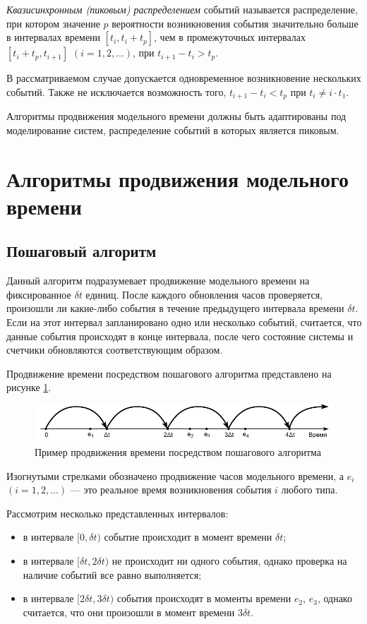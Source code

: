 \textit{Квазисинхронным (пиковым) распределением} событий называется распределение, при котором значение $p$ вероятности возникновения события значительно больше в интервалах времени $[t_i, t_i + t_p]$, чем в промежуточных интервалах $[t_i + t_p, t_{i+1}]$ $(i = 1, 2, ...)$, при $t_{i+1} - t_i > t_p$.

В рассматриваемом случае допускается одновременное возникновение нескольких событий. Также не исключается возможность того, $t_{i+1} - t_i < t_p$ при $t_i \neq i \cdot t_1$.


Алгоритмы продвижения модельного времени должны быть адаптированы под моделирование систем, распределение событий в которых является пиковым.

\section{Алгоритмы продвижения модельного времени}

\subsection{Пошаговый алгоритм}
Данный алгоритм подразумевает продвижение модельного времени на фиксированное $\delta t$ единиц. После каждого обновления часов проверяется, произошли ли какие-либо события в течение предыдущего интервала времени $\delta t$. Если на этот интервал запланировано одно или несколько событий, считается, что данные события происходят в конце интервала, после чего состояние системы и счетчики обновляются соответствующим образом. 

Продвижение времени посредством пошагового алгоритма представлено на рисунке \ref{img:delta_t_example}.

\begin{figure}[h!btp]
	\centering
	\includegraphics[width=0.7\columnwidth]{inc/img/delta_t_example.pdf}
	\caption{Пример продвижения времени посредством пошагового алгоритма}
	\label{img:delta_t_example}	
\end{figure}

Изогнутыми стрелками обозначено продвижение часов модельного времени, а $e_i$ $(i = 1, 2, ...)$ --- это реальное время возникновения события $i$ любого типа.

Рассмотрим несколько представленных интервалов:
\begin{itemize}
	\item в интервале $[0, \delta t)$ событие происходит в момент времени $\delta t$;
	\item в интервале $[\delta t, 2\delta t)$ не происходит ни одного события, однако проверка на наличие событий все равно выполняется;
	\item в интервале $[2\delta t, 3\delta t)$ события происходят в моменты времени $e_2$, $e_3$, однако считается, что они произошли в момент времени $3\delta t$.
\end{itemize}

